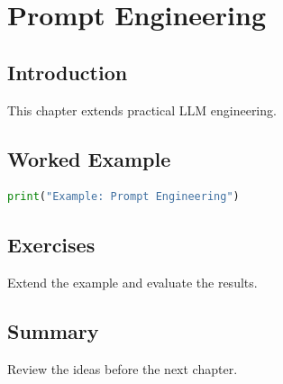 \chapter{Prompt Engineering}
\label{chap:vol9-14}



\section{Introduction}
This chapter extends practical LLM engineering.

\section{Worked Example}
\begin{lstlisting}[language=Python]
print("Example: Prompt Engineering")
\end{lstlisting}

\section{Exercises}
\begin{exercise}
Extend the example and evaluate the results.
\end{exercise}

\section{Summary}
Review the ideas before the next chapter.
